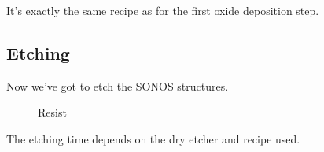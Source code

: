 It's exactly the same recipe as for the first oxide deposition step.

\subsection{Etching}

Now we've got to etch the SONOS structures.

\begin{figure}[H]
	\centering
	\begin{tikzpicture}[node distance = 3cm, auto, thick,scale=\CrossAndTopSection, every node/.style={transform shape}]
		
	\end{tikzpicture}
	\drawStepArrow{}
	\begin{tikzpicture}[node distance = 3cm, auto, thick,scale=\CrossAndTopSection, every node/.style={transform shape}]
		
	\end{tikzpicture}
	\caption{Resist}
\end{figure}

The etching time depends on the dry etcher and recipe used.


